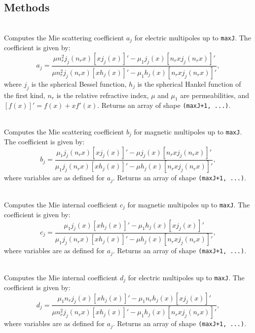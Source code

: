 \subsection{Methods}
\begin{description}[leftmargin=4cm]
    \item[\texttt{a\_j()}] \hfill \\
    Computes the Mie scattering coefficient \( a_j \) for electric multipoles up to \texttt{maxJ}. The coefficient is given by:
    \begin{equation}
        a_j = \frac{\mu n_r^2 j_j(n_r x) [x j_j(x)]' - \mu_1 j_j(x) [n_r x j_j(n_r x)]'}{\mu n_r^2 j_j(n_r x) [x h_j(x)]' - \mu_1 h_j(x) [n_r x j_j(n_r x)]'},
    \end{equation}
    where \( j_j \) is the spherical Bessel function, \( h_j \) is the spherical Hankel function of the first kind, \( n_r \) is the relative refractive index, \( \mu \) and \( \mu_1 \) are permeabilities, and \( [f(x)]' = f(x) + x f'(x) \). Returns an array of shape \texttt{(maxJ+1, ...)}.

    \item[\texttt{b\_j()}] \hfill \\
    Computes the Mie scattering coefficient \( b_j \) for magnetic multipoles up to \texttt{maxJ}. The coefficient is given by:
    \begin{equation}
        b_j = \frac{\mu_1 j_j(n_r x) [x j_j(x)]' - \mu j_j(x) [n_r x j_j(n_r x)]'}{\mu_1 j_j(n_r x) [x h_j(x)]' - \mu h_j(x) [n_r x j_j(n_r x)]'},
    \end{equation}
    where variables are as defined for \( a_j \). Returns an array of shape \texttt{(maxJ+1, ...)}.

    \item[\texttt{c\_j()}] \hfill \\
    Computes the Mie internal coefficient \( c_j \) for magnetic multipoles up to \texttt{maxJ}. The coefficient is given by:
    \begin{equation}
        c_j = \frac{\mu_1 j_j(x) [x h_j(x)]' - \mu_1 h_j(x) [x j_j(x)]'}{\mu_1 j_j(n_r x) [x h_j(x)]' - \mu h_j(x) [n_r x j_j(n_r x)]'},
    \end{equation}
    where variables are as defined for \( a_j \). Returns an array of shape \texttt{(maxJ+1, ...)}.

    \item[\texttt{d\_j()}] \hfill \\
    Computes the Mie internal coefficient \( d_j \) for electric multipoles up to \texttt{maxJ}. The coefficient is given by:
    \begin{equation}
        d_j = \frac{\mu_1 n_r j_j(x) [x h_j(x)]' - \mu_1 n_r h_j(x) [x j_j(x)]'}{\mu n_r^2 j_j(n_r x) [x h_j(x)]' - \mu_1 h_j(x) [n_r x j_j(n_r x)]'},
    \end{equation}
    where variables are as defined for \( a_j \). Returns an array of shape \texttt{(maxJ+1, ...)}.


\end{description}
